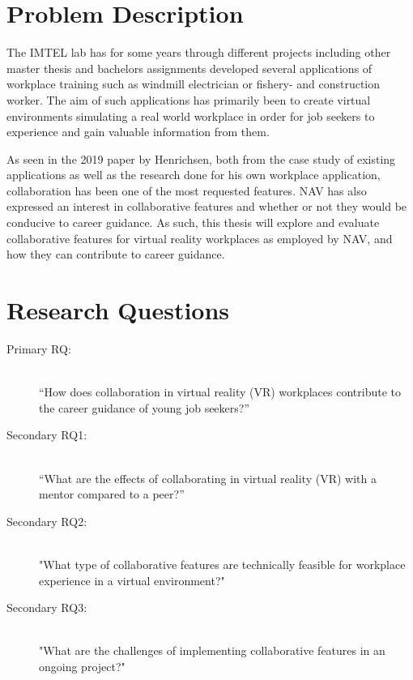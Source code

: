 









%

\section{Problem Description}
The IMTEL lab has for some years through different projects including other master thesis and bachelors assignments developed several applications of workplace training such as windmill electrician \cite{henrichsen2019engaging} or fishery- and construction worker. The aim of such applications has primarily been to create virtual environments simulating a real world workplace in order for job seekers to experience and gain valuable information from them.

As seen in the 2019 paper by Henrichsen, both from the case study of existing applications as well as the research done for his own workplace application, collaboration has been one of the most requested features\cite{henrichsen2019engaging}. NAV has also expressed an interest in collaborative features and whether or not they would be conducive to career guidance. As such, this thesis will explore and evaluate collaborative features for virtual reality workplaces as employed by NAV, and how they can contribute to career guidance.


\clearpage

\section{Research Questions}
\label{RQ}
\begin{description}
    \item [Primary RQ:]\hfill \\
    “How does collaboration in virtual reality (VR) workplaces contribute to the career guidance of young job seekers?” 
    \item [Secondary RQ1:]\hfill \\
    “What are the effects of collaborating in virtual reality (VR) with a mentor compared to a peer?”
    \item [Secondary RQ2:]\hfill \\
    "What type of collaborative features are technically feasible for workplace experience in a virtual environment?"
    \item  [Secondary RQ3:]\hfill \\
    "What are the challenges of implementing collaborative features in an ongoing project?"
\end{description}


